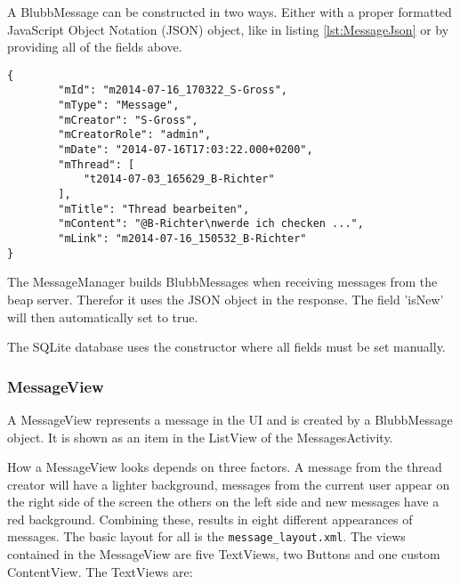 \documentclass[12pt,a4paper,oneside]{report}
\newcommand{\beapServer}{beap server}
\newcommand{\code}[1]{\lstinline{#1}}
\begin{document}
A BlubbMessage can be constructed in two ways. Either with a proper formatted JavaScript Object Notation (JSON) object, like in listing \ref{lst:MessageJson} or by providing all of the fields above. 
\begin{lstlisting}[caption=Message JSON object, label=lst:MessageJson]
{
        "mId": "m2014-07-16_170322_S-Gross",
        "mType": "Message",
        "mCreator": "S-Gross",
        "mCreatorRole": "admin",
        "mDate": "2014-07-16T17:03:22.000+0200",
        "mThread": [
            "t2014-07-03_165629_B-Richter"
        ],
        "mTitle": "Thread bearbeiten",
        "mContent": "@B-Richter\nwerde ich checken ...",
        "mLink": "m2014-07-16_150532_B-Richter"
}

\end{lstlisting}
The MessageManager builds BlubbMessages when receiving messages from the \beapServer{}. Therefor it uses the JSON object in the response. The field 'isNew' will then automatically set to true.


The SQLite database uses the constructor where all fields must be set manually. 

\subsubsection{MessageView}
A MessageView represents a message in the UI and is created by a BlubbMessage object. It is shown as an item in the ListView of the MessagesActivity.


How a MessageView looks depends on three factors. A message from the thread creator will have a lighter background, messages from the current user appear on the right side of the screen the others on the left side and new messages have a red background. Combining these, results in eight different appearances of messages.
The basic layout for all is the \code{message_layout.xml}. The views contained in the MessageView are five TextViews, two Buttons and one custom ContentView.
The TextViews are:
\end{document}
